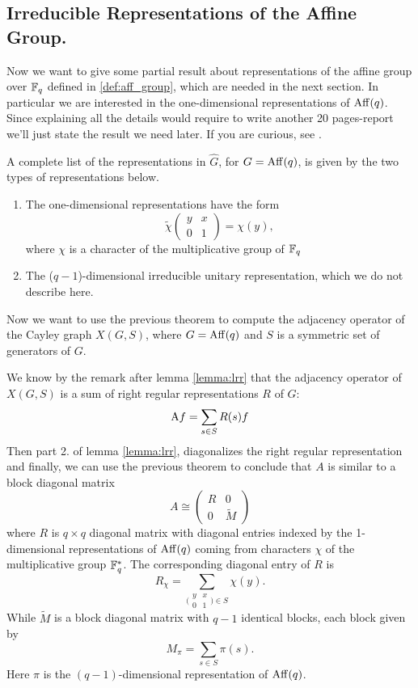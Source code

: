 \subsection{ Irreducible Representations of the Affine Group.}
Now we want to give some partial result about representations of the affine group over ${\mathbb F}_q$ defined in \eqref{def:aff_group}, which are needed in the next section. In particular we are interested in the one-dimensional representations of $\operatorname{Aff}(q)$. Since explaining all the details would require to write another 20 pages-report we'll just state the result we need later. If you are curious, see \cite[Chapters~16-17]{terras_1999}.
\begin{theorem}
A complete  list  of  the representations  in $\hat{G}$, for $G=\operatorname{Aff}(q)$, is  given  by the two types  of representations  below.
\begin{enumerate}
\item The one-dimensional representations have the form
\[
\widetilde{\chi}
\begin{pmatrix}
y &x\\
0 &1
\end{pmatrix}
=\chi(y),
\]
where $\chi$ is a character of the multiplicative group of ${\mathbb F}_q$
\item The ($q-1$)-dimensional  irreducible unitary representation, which we do not describe here.
\end{enumerate}

\end{theorem}
Now we want to use the previous theorem to compute the adjacency operator of  the Cayley graph $X(G,S)$, where $G=\operatorname{Aff}(q)$ and $S$ is a symmetric set of generators of $G$.

We know by the remark after lemma \ref{lemma:lrr} that the  adjacency operator of $X(G,S)$ is a sum  of right regular representations $R$ of $G$:
\[
\operatorname{A\!} f = \sum_{s\in S}R(s)f 
\]
Then part 2. of lemma \ref{lemma:lrr}, diagonalizes the right regular representation and finally, we can use the previous theorem to conclude that $A$ is similar to a block diagonal matrix
\[
A\cong \begin{pmatrix}
R &0 \\
0 &\widetilde{M}
\end{pmatrix}
\] 
where $R$ is $q\times q$ diagonal matrix with diagonal entries indexed  by  the  1-dimensional representations  of $\operatorname{Aff}(q)$ coming  from  characters $\chi$  of the multiplicative group ${\mathbb F}_q^{*}$. The corresponding  diagonal entry  of $R$ is 
\[
R_\chi=\sum_{\bigl(\begin{smallmatrix}
y &x\\
0 &1
\end{smallmatrix}\bigr) \in S }\chi(y).
\]
While $\widetilde{M}$   is a block diagonal matrix with $q-1$ identical blocks, each block given by
\[
M_\pi=\sum_{s\in S}\pi(s).
\]
Here $\pi$ is the $(q-1)$-dimensional representation of $\operatorname{Aff}(q)$.